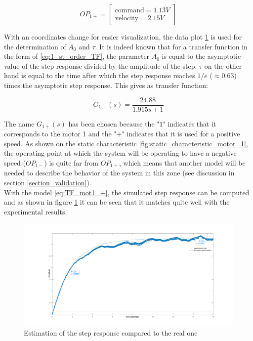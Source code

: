 \begin{equation}
    OP_{1+} = \begin{bmatrix}
        \text{command} = 1.13 V \\
        \text{velocity} = 2.15 V
    \end{bmatrix}
\end{equation}

With an coordinates change for easier visualization, the data plot \ref{fig:estimated_step_response_positive_motor_1} is 
used for the determination of $A_0$ and $\tau$. It is indeed known that for a transfer function in the form of 
\ref{eq:1_st_order_TF}, the parameter $A_0$ is equal to the asymptotic value of the step response divided by the amplitude 
of the step. $\tau$ on the other hand is equal to the time after which the step response reaches $1/e$ ($\approx 0.63$)
times the asymptotic step response. This gives as transfer function:

\begin{equation}
    G_{1+}(s) = \frac{24.88}{1.915s + 1}
    \label{eq:TF_mot1_+}
\end{equation}

The name $G_{1+}(s)$ has been chosen because the "\textit{$1$}" indicates that it corresponds to the motor 1 and the 
"\textit{$+$}" indicates that it is used for a positive speed. As shown on the static characteristic 
\ref{fig:static_characteristic_motor_1}, the operating point at which the system will be operating to have a negative speed 
($OP_{1-}$) is quite far from $OP_{1+}$, which means that another model will be needed to describe the behavior of the 
system in this zone (see discussion in section \ref{section_validation}).\\

With the model \ref{eq:TF_mot1_+}, the simulated step response can be computed and as shown in figure 
\ref{fig:estimated_step_response_positive_motor_1} it can be seen that it matches quite well with the experimental results.

\begin{figure}[H]
    \centering
    \includegraphics[height=\textheight/3]{Pictures/first_order_model_positive_motor_1.png}
    \caption{Estimation of the step response compared to the real one}
    \label{fig:estimated_step_response_positive_motor_1}
\end{figure}

